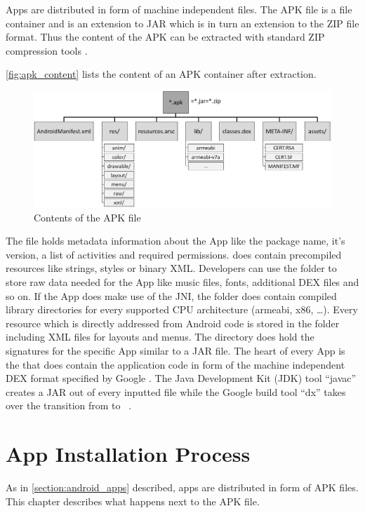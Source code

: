 Apps are distributed in form of machine independent  files.
The APK file is a file container and is an extension to
JAR which is in turn an extension to the ZIP file format.
Thus the content of the APK can be extracted with standard ZIP
compression tools \parencite{securityinternals}.

\autoref{fig:apk_content} lists the content of an APK container
after extraction.
\begin{figure}[htb]
  \includegraphics[width=\textwidth]{figures/apk_content}
  \caption[APK Content]{Contents of the APK file}
  \label{fig:apk_content}
\end{figure}
The  file holds metadata information
about the App like the package name, it's version, a list of
activities and required permissions. 
does contain precompiled resources like strings, styles
or binary XML. Developers can use the  folder
to store raw data needed for the App like music files,
fonts, additional DEX files and so on. If the App does make use of the JNI,
the  folder does contain compiled library directories
for every supported CPU architecture (armeabi, x86, \ldots).
Every resource which is directly addressed from Android code
is stored in the  folder including XML files for
layouts and menus. The  directory does hold
the signatures for the specific App similar to a JAR file.
The heart of every App is the  that does
contain the application code in form of the machine independent
DEX format specified by Google \parencite{dex}. The Java Development
Kit (JDK) tool ``javac'' creates a JAR out of every inputted
  file while the Google build tool ``dx'' takes over
 the transition from  to  ~\parencite{dxtool}.

\section{App Installation Process}\label{section:app_installation}
As in \autoref{section:android_apps} described, apps are distributed
in form of APK files. This chapter describes what happens next to
the APK file.

